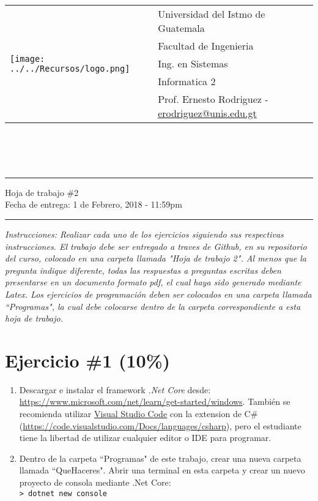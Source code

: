 \documentclass{article}
\newcommand{\horrule}[1]{\rule{\linewidth}{#1}}
\newcommand{\perlscript}[2]{
\begin{itemize}
\item[]
\end{itemize}
}
\begin{document}
\begin{tabular}{l l}
\multirow{5}{*}{\texttt{[image: ../../Recursos/logo.png]}} & Universidad del Istmo de Guatemala \\
 & Facultad de Ingenieria \\
 & Ing. en Sistemas \\
 & Informatica 2 \\
 & Prof. Ernesto Rodriguez - \href{mailto:erodriguez@unis.edu.gt}{erodriguez@unis.edu.gt} \\
\end{tabular}
\\\\\\

\begin{center}
        \horrule{0.5pt}
        \huge{Hoja de trabajo \#2} \\
        \large{Fecha de entrega: 1 de Febrero, 2018 - 11:59pm} \\
        \horrule{1pt}
\end{center}

\emph{Instrucciones: Realizar cada uno de los ejercicios siguiendo sus respectivas
instrucciones. El trabajo debe ser entregado a traves de Github, en su repositorio del curso, colocado en una carpeta llamada "Hoja de trabajo 2".
Al menos que la pregunta indique diferente, todas las respuestas a preguntas escritas deben presentarse en
un documento formato pdf, el cual haya sido generado mediante Latex. Los ejercicios de programaci\'on deben ser colocados en una carpeta
llamada ``Programas", la cual debe colocarse dentro de la carpeta correspondiente a esta hoja de trabajo.}


\section*{Ejercicio \#1 (10\%)}

\begin{enumerate}
        \item {
                Descargar e instalar el framework \emph{.Net Core} desde: 
                \url{https://www.microsoft.com/net/learn/get-started/windows}. Tambi\'en se recomienda utilizar
                \href{https://code.visualstudio.com/}{Visual Studio Code} con la extension de 
                C\# (\url{https://code.visualstudio.com/Docs/languages/csharp}), pero el estudiante tiene la
                libertad de utilizar cualquier editor o IDE para programar.
        }
        \item {
                Dentro de la carpeta ``Programas" de este trabajo, crear una
                nueva carpeta llamada ``QueHaceres". Abrir una terminal en esta
                carpeta y crear un nuevo proyecto de consola mediante .Net Core:
                \\\texttt{> dotnet new console}
        }
\end{enumerate}
\end{document}
